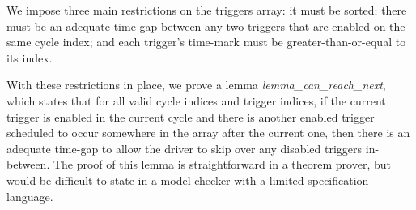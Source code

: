 
We impose three main restrictions on the triggers array: it must be sorted; there must be an adequate time-gap between any two triggers that are enabled on the same cycle index; and each trigger's time-mark must be greater-than-or-equal to its index.

With these restrictions in place, we prove a lemma \emph{lemma_can_reach_next}, which states that for all valid cycle indices and trigger indices, if the current trigger is enabled in the current cycle and there is another enabled trigger scheduled to occur somewhere in the array after the current one, then there is an adequate time-gap to allow the driver to skip over any disabled triggers in-between.
The proof of this lemma is straightforward in a theorem prover, but would be difficult to state in a model-checker with a limited specification language.

  
